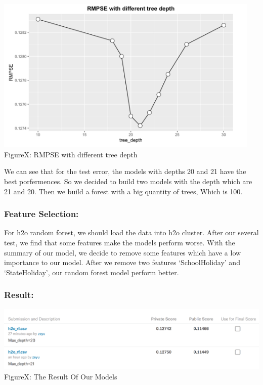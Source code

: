 \documentclass[12pt]{article}
\begin{document}
	\begin{center}
	\includegraphics[width=5in]{image/cross.png}\\
	FigureX: RMPSE with different tree depth
	\end{center}

	We can see that for the test error, the models with depths 20 and 21 have the best porfermences. So we decided to build two models with the depth which are 21 and 20. Then we build a forest with a big quantity of trees, Which is 100.

	\subsubsection{Feature Selection:}

	For h2o random forest, we should load the data into h2o cluster. After our several test, we find that some features make the models perform worse. With the summary of our model, we decide to remove some features which have a low importance to our model. After we remove two features `SchoolHoliday' and `StateHoliday', our random forest model perform better.

	\subsubsection{Result:}

	\begin{center}
	\includegraphics[width=9in]{image/h2ores.png}\\
	FigureX: The Result Of Our Models
	\end{center}	
\end{document}
